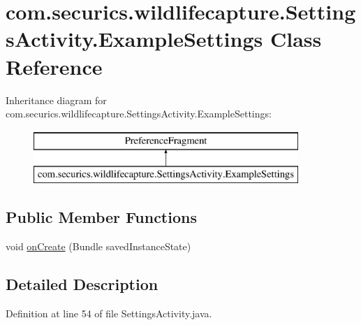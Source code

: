 \hypertarget{classcom_1_1securics_1_1wildlifecapture_1_1_settings_activity_1_1_example_settings}{\section{com.\+securics.\+wildlifecapture.\+Settings\+Activity.\+Example\+Settings Class Reference}
\label{classcom_1_1securics_1_1wildlifecapture_1_1_settings_activity_1_1_example_settings}
}
Inheritance diagram for com.\+securics.\+wildlifecapture.\+Settings\+Activity.\+Example\+Settings\+:\begin{figure}[H]
\begin{center}
\leavevmode
\includegraphics[height=2.000000cm]{classcom_1_1securics_1_1wildlifecapture_1_1_settings_activity_1_1_example_settings}
\end{center}
\end{figure}
\subsection*{Public Member Functions}
\begin{DoxyCompactItemize}
\item 
void \hyperlink{classcom_1_1securics_1_1wildlifecapture_1_1_settings_activity_1_1_example_settings_a5c72b1c34ffdd20992a73b546f970069}{on\+Create} (Bundle saved\+Instance\+State)
\end{DoxyCompactItemize}


\subsection{Detailed Description}


Definition at line 54 of file Settings\+Activity.\+java.



